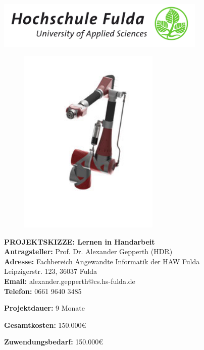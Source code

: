 \documentclass{article}
\begin{document}
\begin{center}
{ \centering \includegraphics[width=10cm]{hsf.png} }

\vspace{-0.8cm}
\begin{figure}[h!]
\centering
\includegraphics[width=0.6\textwidth]{arm.png}
\end{figure}
\vspace{-1.8cm}

{\Huge\bf
PROJEKTSKIZZE: Lernen in Handarbeit
}
\\[2em]
\Large
{\bf Antragsteller:} Prof. Dr. Alexander Gepperth (HDR)\\
{\bf Adresse: } Fachbereich Angewandte Informatik der HAW Fulda\\
Leipzigerstr. 123, 36037 Fulda\\
{\bf Email: } alexander.gepperth@cs.hs-fulda.de\\
{\bf Telefon: } 0661 9640 3485\\
\vspace{0.5cm}

{\bf Projektdauer:} 9 Monate\\
\vspace{0.5cm}

{\bf Gesamtkosten:} 150.000\euro\\
\vspace{0.5cm}

{\bf Zuwendungsbedarf:} 150.000\euro\\
\vspace{0.5cm}

\end{center}
\newpage
\end{document}
